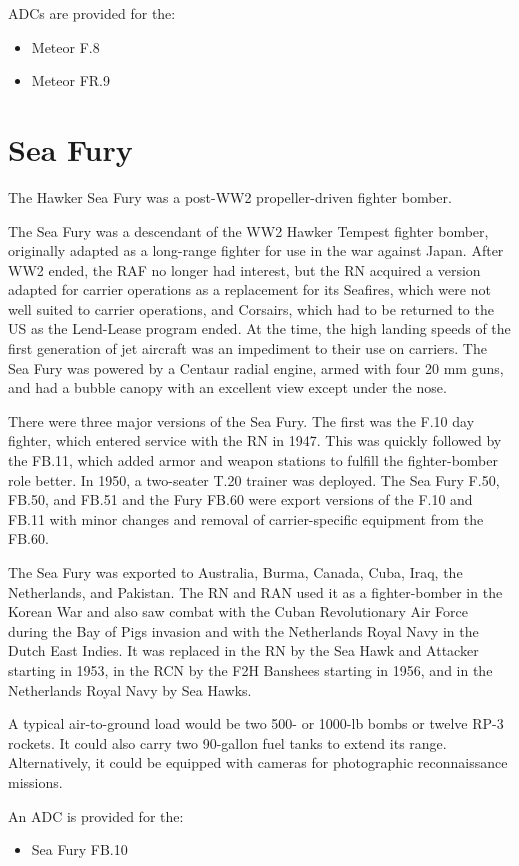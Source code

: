 ADCs are provided for the:
\begin{itemize}
\item Meteor F.8
\item Meteor FR.9
\end{itemize}

\section*{Sea Fury}

The Hawker Sea Fury was a post-WW2 propeller-driven fighter bomber. 

The Sea Fury was a descendant of the WW2 Hawker Tempest fighter bomber, originally adapted as a long-range fighter for use in the war against Japan. After WW2 ended, the RAF no longer had interest, but the RN acquired a version adapted for carrier operations as a replacement for its Seafires, which were not well suited to carrier operations, and Corsairs, which had to be returned to the US as the Lend-Lease program ended. At the time, the high landing speeds of the first generation of jet aircraft was an impediment to their use on carriers. The Sea Fury was powered by a Centaur radial engine, armed with four 20 mm guns, and had a bubble canopy with an excellent view except under the nose.

There were three major versions of the Sea Fury. The first was the F.10 day fighter, which entered service with the RN in 1947. This was quickly followed by the FB.11, which added armor and weapon stations to fulfill the fighter-bomber role better. In 1950, a two-seater T.20 trainer was deployed. The Sea Fury F.50, FB.50, and FB.51 and the Fury FB.60 were export versions of the F.10 and FB.11 with minor changes and removal of carrier-specific equipment from the FB.60. 

The Sea Fury was exported to Australia, Burma, Canada, Cuba, Iraq, the Netherlands, and Pakistan. The RN and RAN used it as a fighter-bomber in the Korean War and also saw combat with the Cuban Revolutionary Air Force during the Bay of Pigs invasion and with the Netherlands Royal Navy in the Dutch East Indies. It was replaced in the RN by the Sea Hawk and Attacker starting in 1953, in the RCN by the F2H Banshees starting in 1956, and in the Netherlands Royal Navy by Sea Hawks.

A typical air-to-ground load would be two 500- or 1000-lb bombs or twelve RP-3 rockets. It could also carry two 90-gallon fuel tanks to extend its range. Alternatively, it could be equipped with cameras for photographic reconnaissance missions.

An ADC is provided for the:
\begin{itemize}
\item Sea Fury FB.10
\end{itemize}
